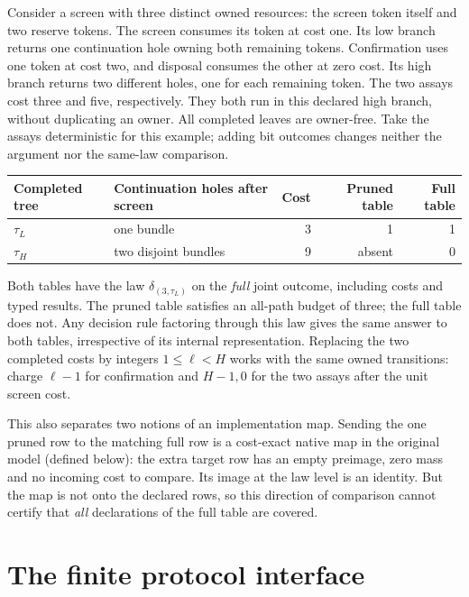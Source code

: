 \documentclass[11pt]{article}
\theoremstyle{definition}
\begin{document}
Consider a screen with three distinct owned resources: the screen token
itself and two reserve tokens. The screen consumes its token at cost one.
Its low branch returns one continuation hole owning both remaining tokens.
Confirmation uses one token at cost two, and disposal consumes the other
at zero cost. Its high branch returns two different holes, one for each
remaining token. The two assays cost three and five, respectively. They
both run in this declared high branch, without duplicating an owner.
All completed leaves are owner-free. Take the assays deterministic for
this example; adding bit outcomes changes neither the argument nor the
same-law comparison.

\begin{center}
\begin{tabular}{@{}llrrr@{}}
\toprule
Completed tree & Continuation holes after screen &
Cost & Pruned table & Full table\\
\midrule
$\tau_L$ & one bundle & 3 & 1 & 1\\
$\tau_H$ & two disjoint bundles & 9 & absent & 0\\
\bottomrule
\end{tabular}
\end{center}
Both tables have the law $\delta_{(3,\tau_L)}$ on the \emph{full} joint
outcome, including costs and typed results. The pruned table satisfies
an all-path budget of three; the full table does not. Any decision rule
factoring through this law gives the same answer to both tables, irrespective
of its internal representation. Replacing the two completed costs by
integers $1\leq \ell<H$ works with the same owned transitions: charge
$\ell-1$ for confirmation and $H-1,0$ for the two assays after the unit
screen cost.

This also separates two notions of an implementation map. Sending
the one pruned row to the matching full row is a cost-exact native map
in the original model (defined below): the extra target row has an
empty preimage, zero mass and no incoming cost to compare. Its image at
the law level is an identity. But the map is not onto the declared
rows, so this direction of comparison cannot certify that \emph{all}
declarations of the full table are covered.

\section{The finite protocol interface}
\end{document}
